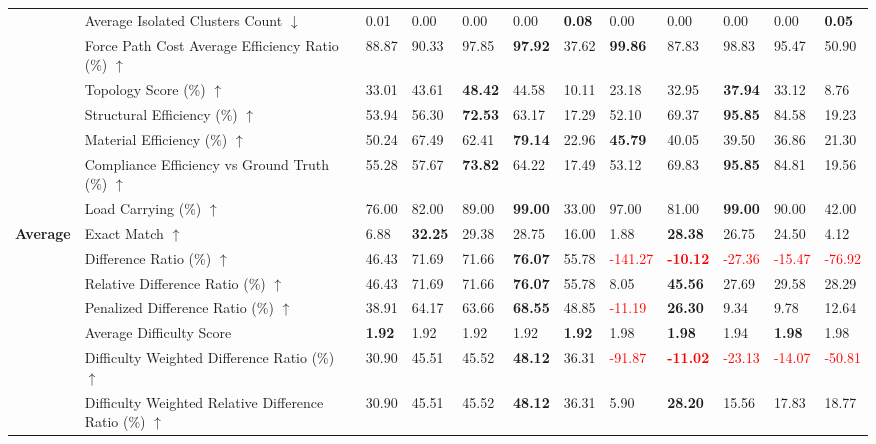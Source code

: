 \begin{table}[!h]
{\begin{tabular}{lllllll|lllll}
 & Average Isolated Clusters Count $\downarrow$ & 0.01 & 0.00 & 0.00 & 0.00 & \textbf{0.08} & 0.00 & 0.00 & 0.00 & 0.00 & \textbf{0.05} \\
 & Force Path Cost Average Efficiency Ratio (\%) $\uparrow$ & 88.87 & 90.33 & 97.85 & \textbf{97.92} & 37.62 & \textbf{99.86} & 87.83 & 98.83 & 95.47 & 50.90 \\
 & Topology Score (\%) $\uparrow$ & 33.01 & 43.61 & \textbf{48.42} & 44.58 & 10.11 & 23.18 & 32.95 & \textbf{37.94} & 33.12 & 8.76 \\
 & Structural Efficiency (\%) $\uparrow$ & 53.94 & 56.30 & \textbf{72.53} & 63.17 & 17.29 & 52.10 & 69.37 & \textbf{95.85} & 84.58 & 19.23 \\
 & Material Efficiency (\%) $\uparrow$ & 50.24 & 67.49 & 62.41 & \textbf{79.14} & 22.96 & \textbf{45.79} & 40.05 & 39.50 & 36.86 & 21.30 \\
 & Compliance Efficiency vs Ground Truth (\%) $\uparrow$ & 55.28 & 57.67 & \textbf{73.82} & 64.22 & 17.49 & 53.12 & 69.83 & \textbf{95.85} & 84.81 & 19.56 \\
 & Load Carrying (\%) $\uparrow$ & 76.00 & 82.00 & 89.00 & \textbf{99.00} & 33.00 & 97.00 & 81.00 & \textbf{99.00} & 90.00 & 42.00 \\
\midrule
\textbf{Average} & Exact Match $\uparrow$ & 6.88 & \textbf{32.25} & 29.38 & 28.75 & 16.00 & 1.88 & \textbf{28.38} & 26.75 & 24.50 & 4.12 \\
 & Difference Ratio (\%) $\uparrow$ & 46.43 & 71.69 & 71.66 & \textbf{76.07} & 55.78 & \textcolor{red}{-141.27} & \textbf{\textcolor{red}{-10.12}} & \textcolor{red}{-27.36} & \textcolor{red}{-15.47} & \textcolor{red}{-76.92} \\
 & Relative Difference Ratio (\%) $\uparrow$ & 46.43 & 71.69 & 71.66 & \textbf{76.07} & 55.78 & 8.05 & \textbf{45.56} & 27.69 & 29.58 & 28.29 \\
 & Penalized Difference Ratio (\%) $\uparrow$ & 38.91 & 64.17 & 63.66 & \textbf{68.55} & 48.85 & \textcolor{red}{-11.19} & \textbf{26.30} & 9.34 & 9.78 & 12.64 \\
 & Average Difficulty Score & \textbf{1.92} & 1.92 & 1.92 & 1.92 & \textbf{1.92} & 1.98 & \textbf{1.98} & 1.94 & \textbf{1.98} & 1.98 \\
 & Difficulty Weighted Difference Ratio (\%) $\uparrow$ & 30.90 & 45.51 & 45.52 & \textbf{48.12} & 36.31 & \textcolor{red}{-91.87} & \textbf{\textcolor{red}{-11.02}} & \textcolor{red}{-23.13} & \textcolor{red}{-14.07} & \textcolor{red}{-50.81} \\
 & Difficulty Weighted Relative Difference Ratio (\%) $\uparrow$ & 30.90 & 45.51 & 45.52 & \textbf{48.12} & 36.31 & 5.90 & \textbf{28.20} & 15.56 & 17.83 & 18.77 \\

\end{tabular}}
\end{table}
